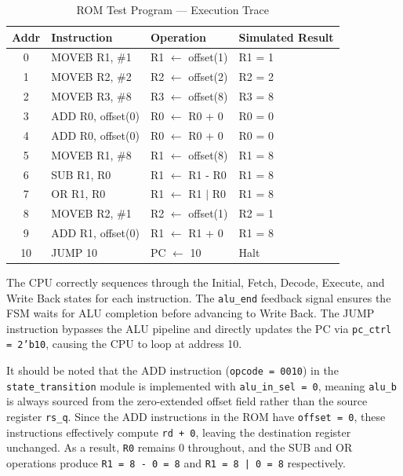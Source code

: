 \documentclass{article}
\begin{document}
\begin{table}[H]
    \centering
    \begin{tabular}{clll}
        \toprule
        \textbf{Addr} & \textbf{Instruction} & \textbf{Operation} & \textbf{Simulated Result} \\
        \midrule
        0  & MOVEB R1, \#1     & R1 $\leftarrow$ offset(1)  & R1 = 1 \\
        1  & MOVEB R2, \#2     & R2 $\leftarrow$ offset(2)  & R2 = 2 \\
        2  & MOVEB R3, \#8     & R3 $\leftarrow$ offset(8)  & R3 = 8 \\
        3  & ADD R0, offset(0) & R0 $\leftarrow$ R0 + 0     & R0 = 0 \\
        4  & ADD R0, offset(0) & R0 $\leftarrow$ R0 + 0     & R0 = 0 \\
        5  & MOVEB R1, \#8     & R1 $\leftarrow$ offset(8)  & R1 = 8 \\
        6  & SUB R1, R0        & R1 $\leftarrow$ R1 - R0    & R1 = 8 \\
        7  & OR R1, R0         & R1 $\leftarrow$ R1 $|$ R0  & R1 = 8 \\
        8  & MOVEB R2, \#1     & R2 $\leftarrow$ offset(1)  & R2 = 1 \\
        9  & ADD R1, offset(0) & R1 $\leftarrow$ R1 + 0     & R1 = 8 \\
        10 & JUMP 10           & PC $\leftarrow$ 10         & Halt   \\
        \bottomrule
    \end{tabular}
    \caption{ROM Test Program --- Execution Trace}
    \label{tab:rom_trace}
\end{table}

The CPU correctly sequences through the Initial, Fetch, Decode, Execute, and Write Back states for each instruction. The \texttt{alu\_end} feedback signal ensures the FSM waits for ALU completion before advancing to Write Back. The JUMP instruction bypasses the ALU pipeline and directly updates the PC via \texttt{pc\_ctrl = 2'b10}, causing the CPU to loop at address 10.

It should be noted that the ADD instruction (\texttt{opcode = 0010}) in the \texttt{state\_transition} module is implemented with \texttt{alu\_in\_sel = 0}, meaning \texttt{alu\_b} is always sourced from the zero-extended offset field rather than the source register \texttt{rs\_q}. Since the ADD instructions in the ROM have \texttt{offset = 0}, these instructions effectively compute \texttt{rd + 0}, leaving the destination register unchanged. As a result, \texttt{R0} remains 0 throughout, and the SUB and OR operations produce \texttt{R1 = 8 - 0 = 8} and \texttt{R1 = 8 | 0 = 8} respectively.
\end{document}
